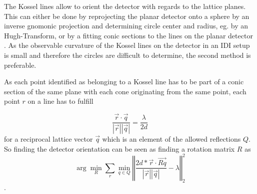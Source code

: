 The Kossel lines allow to orient the detector with regards to the lattice planes. This can either be done by reprojecting the planar detector onto a sphere by an inverse gnomonic projection and determining circle center and radius, eg. by an Hugh-Transform, or by a fitting conic sections to the lines on the planar detector \cite{morris1968,morawiec2016,faigel2016,herron2018}. As the observable curvature of the Kossel lines on the detector in an IDI setup is small and therefore the circles are difficult to determine, the second method is preferable. 

As each point identified as belonging to a Kossel line has to be part of a conic section of the same plane with each cone originating from the same point, each point $r$ on a line has to fulfill

\begin{equation}
\frac{\vec{r} \cdot \vec{q}}{\left|\vec{r}\right| \left| \vec{q}\right|} = \frac{\lambda}{2d}
\end{equation}
 for a reciprocal lattice vector $\vec{q}$ which is an element of the allowed reflections $Q$. So finding the detector orientation can be seen as finding a rotation matrix $R$ as
\begin{equation}
\arg\!\min_{R} \sum_{r} \min_{q\in Q} \left\Vert \frac{2 d * \vec{r} \cdot \vec{Rq}}{\left|\vec{r}\right| \left| \vec{q}\right|} -\lambda \right\Vert_2^2
\end{equation}.
